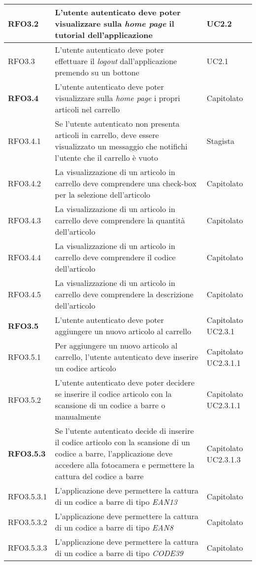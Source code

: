 {\begin{center}
\begin{longtable}{ | >{\centering\arraybackslash}p{2.5cm} | >{\arraybackslash}p{7cm} | >{\centering\arraybackslash}p{2cm} | }
RFO3.2 & L'utente autenticato deve poter visualizzare sulla \textit{home page} il tutorial dell'applicazione & UC2.2 \\ \hline
RFO3.3 & L'utente autenticato deve poter effettuare il \textit{logout} dall'applicazione premendo su un bottone & UC2.1 \\ \hline
\textbf{RFO3.4} & L'utente autenticato deve poter visualizzare sulla \textit{home page} i propri articoli nel carrello & Capitolato \\ \hline
RFO3.4.1 & Se l'utente autenticato non presenta articoli in carrello, deve essere visualizzato un messaggio che notifichi l'utente che il carrello è vuoto & Stagista \\ \hline
RFO3.4.2 & La visualizzazione di un articolo in carrello deve comprendere una check-box per la selezione dell'articolo & Capitolato \\ \hline
RFO3.4.3 & La visualizzazione di un articolo in carrello deve comprendere la quantità dell'articolo & Capitolato \\ \hline
RFO3.4.4 & La visualizzazione di un articolo in carrello deve comprendere il codice dell'articolo & Capitolato \\ \hline
RFO3.4.5 & La visualizzazione di un articolo in carrello deve comprendere la descrizione dell'articolo & Capitolato \\ \hline
\textbf{RFO3.5} & L'utente autenticato deve poter aggiungere un nuovo articolo al carrello & Capitolato UC2.3.1 \\ \hline
RFO3.5.1 & Per aggiungere un nuovo articolo al carrello, l'utente autenticato deve inserire un codice articolo & Capitolato UC2.3.1.1 \\ \hline
RFO3.5.2 & L'utente autenticato deve poter decidere se inserire il codice articolo con la scansione di un codice a barre o manualmente & Capitolato UC2.3.1.1 \\ \hline
\textbf{RFO3.5.3} & Se l'utente autenticato decide di inserire il codice articolo con la scansione di un codice a barre, l'applicazione deve accedere alla fotocamera e permettere la cattura del codice a barre & Capitolato UC2.3.1.3 \\ \hline
RFO3.5.3.1 & L'applicazione deve permettere la cattura di un codice a barre di tipo \textit{EAN13} & Capitolato \\ \hline
RFO3.5.3.2 & L'applicazione deve permettere la cattura di un codice a barre di tipo \textit{EAN8} & Capitolato \\ \hline
RFO3.5.3.3 & L'applicazione deve permettere la cattura di un codice a barre di tipo \textit{CODE39} & Capitolato \\ \hline

\end{longtable}
\end{center}}
